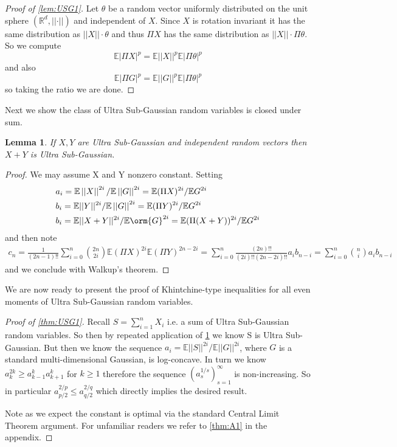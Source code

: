 \documentclass[10pt]{article}
\newcommand{\E}{\mathbb{E}}
\newcommand{\1}{\textbf{1}}
\newcommand{\R}{\mathbb{R}}
\newcommand{\norm}[1]{\left\lvert\left\lvert#1\right\rvert\right\rvert}
\newcommand{\normOne}[1]{\left\lvert#1\right\rvert}
\newtheorem{lemma}{Lemma}[subsection]
\theoremstyle{remark}
\theoremstyle{definition}
\begin{document}
\begin{proof}[Proof of \ref{lem:USG1}]
	Let $\theta$ be a random vector uniformly distributed on the unit sphere $(\R^d,\norm{\cdot})$ and independent of $X$. Since $X$ is rotation invariant it has the same distribution as $\norm{X}\cdot \theta$ and thus $\Pi X$ has the same distribution as $\norm{X} \cdot \Pi \theta$. So we compute
	\begin{equation*}
		\E\normOne{\Pi
		 X}^p = \E \norm{X}^p \E\normOne{\Pi \theta}^p
	\end{equation*} and also
	\begin{equation*}
		\E \normOne{\Pi G}^p = \E\norm{G}^p \E\normOne{\Pi \theta}^p
	\end{equation*} so taking the ratio we are done.
\end{proof}

Next we show the class of Ultra Sub-Gaussian random variables is closed under sum. 

\begin{lemma}\label{lem:USG2}
	If $X,Y$ are Ultra Sub-Gaussian and  independent random vectors then $X+Y$ is Ultra Sub-Gaussian.
\end{lemma}

\begin{proof}
	We may assume X and Y nonzero constant. Setting
	\begin{align*}
		&a_i = \E\norm{X}^{2i}/\E\norm{G}^{2i} = \E(\Pi X)^{2i}/\E G^{2i}\\
		&b_i = \E||Y||^{2i}/\E\norm{G}^{2i} = \E(\Pi Y)^{2i}/\E G^{2i}\\
		&b_i = \E||X+Y||^{2i}/\E\orm{G}^{2i} = \E(\Pi (X+Y))^{2i}/\E G^{2i}
	\end{align*}
	and then note
	\begin{align*}
		c_n  = \frac{1}{(2n-1)!!}\sum_{i=0}^{n}{2n \choose 2i} \E(\Pi X)^{2i} \E(\Pi Y)^{2n - 2i} = \sum_{i=0}^n \frac{(2n)!!}{(2i)!!(2n-2i)!!}a_ib_{n-i} = \sum_{i=0}^n {n \choose i}a_i b_{n-i}
	\end{align*}
	and we conclude with Walkup's theorem.
\end{proof}

We are now ready to present the proof of Khintchine-type inequalities for all even moments of Ultra Sub-Gaussian random variables.

\begin{proof}[Proof of \ref{thm:USG1}]

	Recall $S = \sum_{i=1}^n X_i$ i.e. a sum of Ultra Sub-Gaussian random variables. So then by repeated application of \ref{lem:USG2} we know S is Ultra Sub-Gaussian. But then we know the sequence $a_i = \E\norm{S}^{2i}/\E\norm{G}^{2i}$, where $G$ is a standard multi-dimensional Gaussian, is log-concave. In turn we know $a_k^{2k} \geq a_{k-1}^ka_{k+1}^k$ for $k \geq 1$ therefore the sequence $(a_s^{1/s})_{s=1}^{\infty}$ is non-increasing. So in particular $a_{p/2}^{2/p} \leq a_{q/2}^{2/q}$ which directly implies the desired result.

	Note as we expect the constant is optimal via the standard Central Limit Theorem argument. For unfamiliar readers we refer to \ref{thm:A1} in the appendix.
\end{proof}
\end{document}
